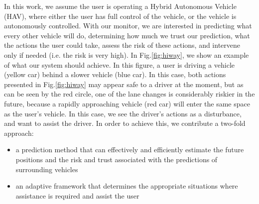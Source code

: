 \documentclass[letterpaper, 10 pt, conference]{ieeeconf}  %
\newcommand\NB[1]{$\spadesuit$\footnote{NB: #1}}
\begin{document}
In this work, we assume the user is operating a Hybrid Autonomous Vehicle (HAV), where either the user has full control of the vehicle, or the vehicle is autonomously controlled. With our monitor, we are interested in predicting what every other vehicle will do, determining how much we trust our prediction, what the actions the user could take, assess the risk of these actions, and intervene only if needed (i.e. the risk is very high). 
In Fig.\ref{fig:hiway}, we show an example of what our system should achieve. In this figure, a user is driving a vehicle (yellow car) behind a slower vehicle (blue car). In this case, both actions presented in Fig.\ref{fig:hiway} may appear safe to a driver at the moment, but as can be seen by the red circle, one of the lane changes is considerably riskier in the future, because a rapidly approaching vehicle (red car) will enter the same space as the user's vehicle. In this case, we see the driver's actions as a disturbance, and want to assist the driver. In order to achieve this, we contribute a two-fold approach:
    \begin{itemize}
    \item{a prediction method that can effectively and efficiently estimate the future positions and the risk and trust associated with the predictions of surrounding vehicles} %
    \item{an adaptive framework that determines the appropriate situations where assistance is required and assist the user} %
    \end{itemize}
    
\end{document}
